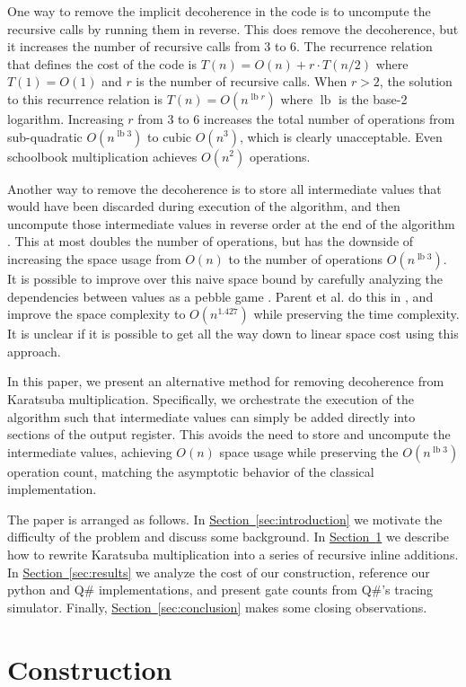 \documentclass[onecolumn,unpublished]{quantumarticle}
\renewcommand{\sec}[1]{\hyperref[sec:#1]{Section~\ref*{sec:#1}}}
\def\lb{\operatorname{lb}}
\begin{document}
One way to remove the implicit decoherence in the code is to uncompute the recursive calls by running them in reverse.
This does remove the decoherence, but it increases the number of recursive calls from 3 to 6.
The recurrence relation that defines the cost of the code is $T(n) = O(n) + r \cdot T(n/2)$ where $T(1) = O(1)$ and $r$ is the number of recursive calls.
When $r>2$, the solution to this recurrence relation is $T(n) = O(n^{\lb r})$ where $\lb$ is the base-2 logarithm.
Increasing $r$ from 3 to 6 increases the total number of operations from sub-quadratic $O(n^{\lb 3})$ to cubic $O(n^3)$, which is clearly unacceptable.
Even schoolbook multiplication achieves $O(n^2)$ operations.

Another way to remove the decoherence is to store all intermediate values that would have been discarded during execution of the algorithm, and then uncompute those intermediate values in reverse order at the end of the algorithm \cite{bennett1973logical}.
This at most doubles the number of operations, but has the downside of increasing the space usage from $O(n)$ to the number of operations $O(n^{\lb 3})$.
It is possible to improve over this naive space bound by carefully analyzing the dependencies between values as a pebble game \cite{bennett1989pebble}.
Parent et al. do this in \cite{parent2017karatsuba}, and improve the space complexity to $O(n^{1.427})$ while preserving the time complexity.
It is unclear if it is possible to get all the way down to linear space cost using this approach.

In this paper, we present an alternative method for removing decoherence from Karatsuba multiplication.
Specifically, we orchestrate the execution of the algorithm such that intermediate values can simply be added directly into sections of the output register.
This avoids the need to store and uncompute the intermediate values, achieving $O(n)$ space usage while preserving the $O(n^{\lb 3})$ operation count, matching the asymptotic behavior of the classical implementation.

The paper is arranged as follows.
In \sec{introduction} we motivate the difficulty of the problem and discuss some background.
In \sec{methods} we describe how to rewrite Karatsuba multiplication into a series of recursive inline additions.
In \sec{results} we analyze the cost of our construction, reference our python and Q\# implementations, and present gate counts from Q\#'s tracing simulator.
Finally, \sec{conclusion} makes some closing observations.

\section{Construction}
\label{sec:methods}
\end{document}
